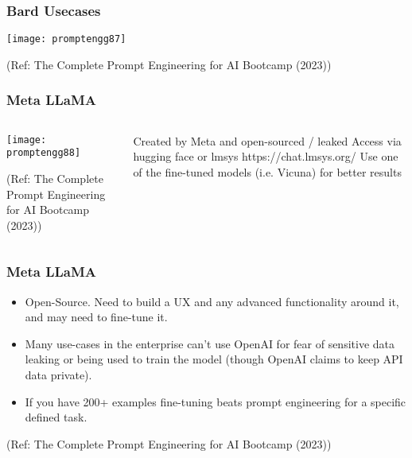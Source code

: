 \begin{frame}[fragile]\frametitle{Bard Usecases}


		\begin{center}
		\texttt{[image: promptengg87]}

		{\tiny (Ref: The Complete Prompt Engineering for AI Bootcamp (2023))}
		\end{center}	

\end{frame}



\begin{frame}[fragile]\frametitle{Meta LLaMA}


\begin{columns}
    \begin{column}[T]{0.6\linewidth}
		\begin{center}
		\texttt{[image: promptengg88]}

		{\tiny (Ref: The Complete Prompt Engineering for AI Bootcamp (2023))}
		\end{center}	
    \end{column}
    \begin{column}[T]{0.4\linewidth}
		Created by Meta and open-sourced / leaked
		Access via hugging face or lmsys https://chat.lmsys.org/
		Use one of the fine-tuned models (i.e. Vicuna) for better results
    \end{column}
  \end{columns}
\end{frame}


\begin{frame}[fragile]\frametitle{Meta LLaMA}

\begin{itemize}
\item  Open-Source. Need to build a UX and any advanced functionality around it, and may need to fine-tune it.
\item Many use-cases in the enterprise can’t use OpenAI for fear of sensitive data leaking or being used to train the model (though OpenAI claims to keep API data private).
\item If you have 200+ examples fine-tuning beats prompt engineering for a specific defined task.
\end{itemize}	 

{\tiny (Ref: The Complete Prompt Engineering for AI Bootcamp (2023))}

\end{frame}

